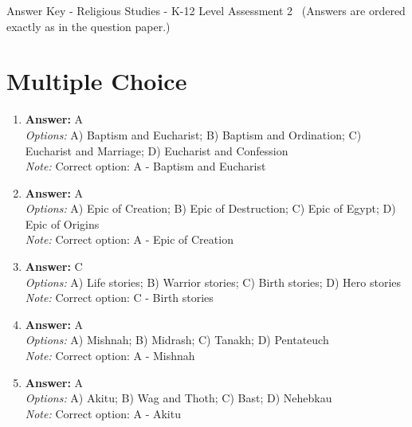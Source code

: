 \documentclass[12pt]{article}
\begin{document}
\begin{center}
Answer Key - Religious Studies - K-12 Level Assessment 2 \
\small (Answers are ordered exactly as in the question paper.)
\end{center}

\section*{Multiple Choice}
\begin{enumerate}[label=\arabic*.]
\item \textbf{Answer:} A
\\ \textit{Options:} A) Baptism and Eucharist; B) Baptism and Ordination; C) Eucharist and Marriage; D) Eucharist and Confession
\\ \textit{Note:} Correct option: A - Baptism and Eucharist
\item \textbf{Answer:} A
\\ \textit{Options:} A) Epic of Creation; B) Epic of Destruction; C) Epic of Egypt; D) Epic of Origins
\\ \textit{Note:} Correct option: A - Epic of Creation
\item \textbf{Answer:} C
\\ \textit{Options:} A) Life stories; B) Warrior stories; C) Birth stories; D) Hero stories
\\ \textit{Note:} Correct option: C - Birth stories
\item \textbf{Answer:} A
\\ \textit{Options:} A) Mishnah; B) Midrash; C) Tanakh; D) Pentateuch
\\ \textit{Note:} Correct option: A - Mishnah
\item \textbf{Answer:} A
\\ \textit{Options:} A) Akitu; B) Wag and Thoth; C) Bast; D) Nehebkau
\\ \textit{Note:} Correct option: A - Akitu
\end{enumerate}
\end{document}
